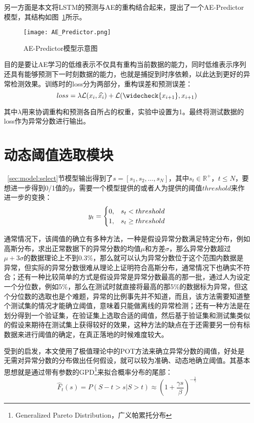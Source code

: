另一方面是本文将LSTM的预测与AE的重构结合起来，提出了一个AE-Predictor模型，其结构如图~\ref{fig:AE-Predictor}所示。

\begin{figure}[htbp]
  \centering
  \texttt{[image: AE\_Predictor.png]}
  \caption{AE-Predictor模型示意图}
  \label{fig:AE-Predictor}
\end{figure}

目的是要让AE学习的低维表示不仅具有重构当前数据的能力，同时低维表示序列还具有能够预测下一时刻数据的能力，也就是捕捉到时序依赖，以此达到更好的异常检测效果。训练时的loss分为两部分，重构误差和预测误差：
\begin{equation*}
  loss = \lambda \mathcal{L}(x_i,\widehat{x_{i}}) + \mathcal{L}(\widecheck{x_{i+1}},x_{i+1})
\end{equation*}

其中$\lambda$用来协调重构和预测各自所占的权重，实验中设置为1。最终将测试数据的loss作为异常分数进行输出。

\section{动态阈值选取模块}
~\ref{sec:model:select}节模型输出得到了$s = [s_1, s_2,\dots,s_N]$，其中$s_t\in \mathbb{R}^+$，$t\leq N$，要想进一步得到0/1值的$y$，需要一个模型提供的或者人为提供的阈值$threshold$来作进一步的变换：
\begin{equation*}
  y_t = \begin{cases}
    0, & s_t < threshold \cr
    1, & s_t \geq threshold
  \end{cases}
\end{equation*}

通常情况下，该阈值的确立有多种方法，一种是假设异常分数满足特定分布，例如高斯分布，求出正常数据下的异常分数的均值$\mu$和方差$\sigma$，那么异常分数超过$\mu + 3\sigma$的数据理论上不到0.3\%，那么就可以认为异常分数位于这个范围内数据是异常，但实际的异常分数很难从理论上证明符合高斯分布，通常情况下也确实不符合；还有一种比较简单的方式是假设异常是异常分数最高的那一批，通过人为设定一个分位数，例如5\%，那么在测试时就直接将最高的那5\%的数据标为异常，但这个分位数的选取也是个难题，异常的比例事先并不知道，而且，该方法需要知道整个测试集的情况才能确立阈值，意味着只能做离线的异常检测；还有一种方法是在划分得到一个验证集，在验证集上选取合适的阈值，然后基于验证集和测试集类似的假设来期待在测试集上获得较好的效果，这种方法的缺点在于还需要另一份有标数据来进行阈值的确定，在真正落地的时候难度较大。

受到\cite{siffer2017anomaly}的启发，本文使用了极值理论中的POT方法来确立异常分数的阈值，好处是无需对异常分数的分布做出任何假设，就可以较为准确、动态地确立阈值。其基本思想就是通过带有参数的GPD\footnote{Generalized Pareto Distribution，广义帕累托分布}来拟合概率分布的尾部：
\begin{equation*}
  \hat{F}_{t}(s) = P(S - t > s | S > t) \approx (1 + \frac{\gamma s}{\beta})^{-\frac{1}{\gamma}}
\end{equation*}

